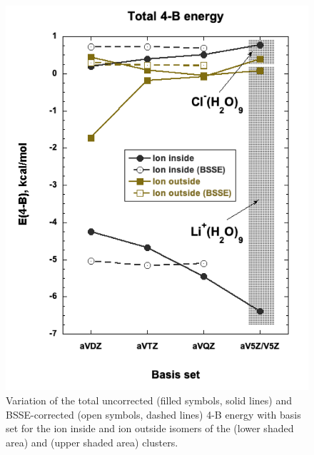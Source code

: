 \begin{figure}[h]
\uwsinglespace
\centering
\includegraphics[width=.5\textwidth]{Figures/Chapter_3/figure_6.pdf}
\caption[Variation of the total uncorrected (filled symbols, solid lines) and BSSE-corrected (open symbols, dashed lines) 4-B energy with basis set for the ion inside and ion outside isomers of the  (lower shaded area) and  (upper shaded area) clusters.]{Variation of the total uncorrected (filled symbols, solid lines) and BSSE-corrected (open symbols, dashed lines) 4-B energy with basis set for the ion inside and ion outside isomers of the  (lower shaded area) and  (upper shaded area) clusters.}
\label{fig:MBE_II_6}
\end{figure}